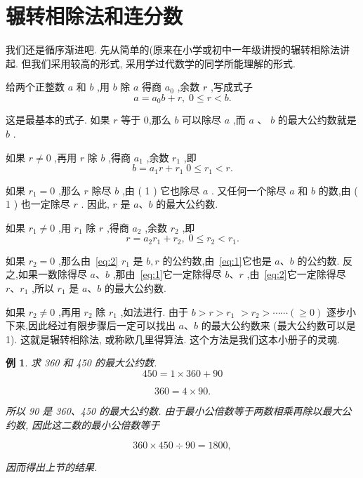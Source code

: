 \documentclass{ctexart}
\newtheorem{example}{\indent 例}[section]
\begin{document}
\section{辗转相除法和连分数}

我们还是循序渐进吧. 先从简单的(原来在小学或初中一年级讲授的辗转相除法讲起. 但我们采用较高的形式, 采用学过代数学的同学所能理解的形式.

给两个正整数 \(a\) 和 \(b\) ,用 \(b\) 除 \(a\) 得商 \({a}_{0}\) ,余数 \(r\) ,写成式子
\begin{equation}
\label{eq:1}
a = {a}_{0}b + r,\;0 \leq r < b. 
\end{equation}


这是最基本的式子. 如果 \(r\) 等于 0,那么 \(b\) 可以除尽 \(a\) ,而 \(a\) 、 \(b\) 的最大公约数就是 \(b\) .

如果 \(r \neq 0\) ,再用 \(r\) 除 \(b\) ,得商 \({a}_{1}\) ,余数 \({r}_{1}\) ,即
\begin{equation}
\label{eq:2}
b = {a}_{1}r + {r}_{1}\;0 \leq {r}_{1} < r. 
\end{equation}

如果 \({r}_{1} = 0\) ,那么 \(r\) 除尽 \(b\) ,由 ( 1 ) 它也除尽 \(a\) . 又任何一个除尽 \(a\) 和 \(b\) 的数,由 ( 1 ) 也一定除尽 \(r\) . 因此, \(r\) 是 \(a\text{、}b\) 的最大公约数.

如果 \({r}_{1} \neq 0\) ,用 \({r}_{1}\) 除 \(r\) ,得商 \({a}_{2}\) ,余数 \({r}_{2}\) ,即
\begin{equation}
\label{eq:3}
r = {a}_{2}{r}_{1} + {r}_{2},\;0 \leq {r}_{2} < {r}_{1}.
\end{equation}

如果 \({r}_{2} = 0\) ,那么由~\eqref{eq:2} \({r}_{1}\) 是 \(b,r\) 的公约数,由~\eqref{eq:1}它也是 \(a\text{、}b\) 的公约数. 反之,如果一数除得尽 \(a\text{、}b\) ,那由~\eqref{eq:1}它一定除得尽 \(b\text{、}r\) ,由~\eqref{eq:2}它一定除得尽 \(r\text{、}{r}_{1}\) ,所以 \({r}_{1}\) 是 \(a\text{、}b\) 的最大公约数.

如果 \({r}_{2} \neq 0\) ,再用 \({r}_{2}\) 除 \({r}_{1}\) ,如法进行. 由于 \(b > r > {r}_{1}\) \(> {r}_{2} > \cdots \cdots \left( { \geq 0}\right)\) 逐步小下来,因此经过有限步骤后一定可以找出 \(a\text{、}b\) 的最大公约数来 (最大公约数可以是 1). 这就是辗转相除法, 或称欧几里得算法. 这个方法是我们这本小册子的灵魂.

\begin{example}
  求 360 和 450 的最大公约数.
\[
{450} = 1 \times {360} + {90}
\]

\[
{360} = 4 \times {90}\text{.}
\]

所以 90 是 360、450 的最大公约数. 由于最小公倍数等于两数相乘再除以最大公约数, 因此这二数的最小公倍数等于

\[
{360} \times {450} \div {90} = {1800},
\]

因而得出上节的结果.
\end{example}
\end{document}
